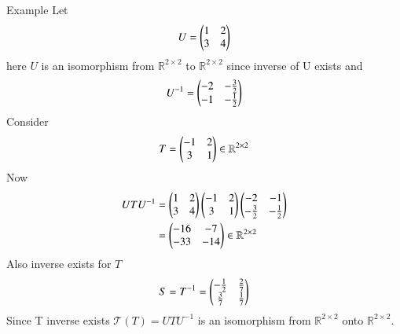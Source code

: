 {Example}
Let
\begin{equation}
	U = \begin{pmatrix}1 & 2\\3 & 4\end{pmatrix}
\end{equation}
here $U$ is an isomorphism from $\mathbb{R}^{2 \times 2}$ to $\mathbb{R}^{2 \times 2}$ since inverse of U exists and
\begin{equation}
	U^{-1} = \begin{pmatrix}-2 & -\frac{3}{2}\\-1 & -\frac{1}{2}\end{pmatrix}
\end{equation}
Consider
\begin{equation}
	T = \begin{pmatrix}-1 & 2\\3 & 1\end{pmatrix} \in \mathbb{R}^{2 \times 2}
\end{equation}
Now
\begin{align}
	UTU^{-1} &= \begin{pmatrix}1 & 2\\3 & 4\end{pmatrix}\begin{pmatrix}-1 & 2\\3 & 1\end{pmatrix}\begin{pmatrix}-2 & -1\\-\frac{3}{2} & -\frac{1}{2}\end{pmatrix}\\
	&= \begin{pmatrix}-16 & -7\\-33 & -14\end{pmatrix} \in \mathbb{R}^{2 \times 2}
\end{align}
Also inverse exists for $T$
\begin{align}
	S = T^{-1} = \begin{pmatrix}-\frac{1}{2} & \frac{2}{7}\\\frac{3}{7} & \frac{1}{7}\end{pmatrix}
\end{align}
Since T inverse exists $\mathcal{T}(T) = UTU^{-1}$ is an isomorphism from $\mathbb{R}^{2\times2}$ onto $\mathbb{R}^{2\times2}$.  

